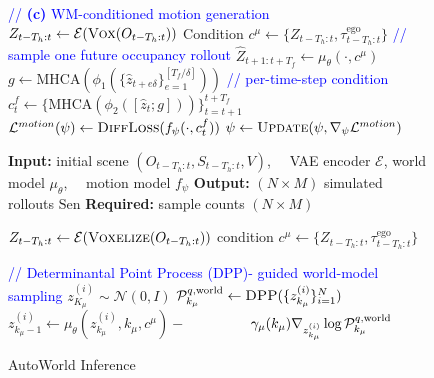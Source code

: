 \documentclass[runningheads]{llncs}
\begin{document}
\begin{figure}[!t]
\begin{minipage}[t]{0.51\textwidth}
\begin{algorithm}[H]
\begin{algorithmic}[1]
\Statex
\Statex \textcolor{blue}{// \textbf{(c)} WM-conditioned motion generation}
 \label{algline:motion_start}
    \State $Z_{t-T_h:t}\gets\mathcal E(\textsc{Vox}(O_{t-T_h:t}))$
    \State Condition $c^\mu\gets\{Z_{t-T_h:t},\tau^{\text{ego}}_{t-T_h:t}\}$
    \Statex \hspace{4mm} \textcolor{blue}{// sample one future occupancy rollout}
    \State $\hat Z_{t+1:t+T_f}\gets\mu_\theta(\cdot,c^\mu)$ \label{algline:sample_from_wm}
    \State $g\gets\mathrm{MHCA}(\phi_1\!(\{\hat z_{t+e\delta}\}_{e=1}^{[ T_f/\delta]}))$\label{algline:predictive_scene_context}
    \Statex \hspace{4mm} \textcolor{blue}{// per-time-step condition}
    \State $c_t^f\gets\{\mathrm{MHCA}(\phi_2([\hat z_t;g]))\}_{t=t+1}^{t+T_f}$ \label{algline:diff_condition}
    \State $\mathcal L^{motion}(\psi)\gets\textsc{DiffLoss}(f_\psi(\cdot,c_t^f))$
    \State $\psi\gets\textsc{Update}(\psi,\nabla_\psi\mathcal L^{motion})$
    \label{algline:motion_end}
\EndFor

\end{algorithmic}
\end{algorithm}
\end{minipage}
\begin{minipage}[t]{0.48\textwidth}
\begin{algorithm}[H]
\scriptsize
\caption{\small AutoWorld Inference}
\label{alg:infer}
\begin{algorithmic}[1]

\State \textbf{Input:} initial scene $(O_{t-T_h:t},S_{t-T_h:t},V)$,
\Statex $\quad$VAE encoder $\mathcal{E}$, world model $\mu_\theta$,
\Statex $\quad$motion model $f_\psi$
\State \textbf{Output:} $(N\times M)$ simulated rollouts $\text{Sen}$
\State \textbf{Required:} sample counts $(N\times M)$

\Statex
\State $Z_{t-T_h:t}\gets \mathcal E(\textsc{Voxelize}(O_{t-T_h:t}))$ \label{algline:vox_then_encode}
\State condition $c^\mu\gets\{Z_{t-T_h:t},\tau^{\text{ego}}_{t-T_h:t}\}$

\Statex
\Statex \textcolor{blue}{// Determinantal Point Process (DPP)-}
\Statex \textcolor{blue}{ guided world-model sampling}
 \label{algline:dpp_wm_start}
    \State $z^{(i)}_{K_\mu}\sim\mathcal N(0,I)$
\EndFor
{}
    \State $\mathcal P^{q,\text{world}}_{k_\mu}\gets \textsc{DPP}(\{z^{(i)}_{k_\mu}\}_{i=1}^{N})$
        \State \label{algline:dpp_wm_end} $z^{(i)}_{k_\mu-1}\gets \mu_\theta(z^{(i)}_{k_\mu},k_\mu,c^\mu)-$ 
        \Statex $\hspace{15mm}\gamma_\mu(k_\mu)\nabla_{z^{(i)}_{k_\mu}}\log \mathcal P^{q,\text{world}}_{k_\mu}$ 
    \EndFor
\EndFor


\end{algorithmic}
\end{algorithm}
\end{minipage}
\end{figure}
\end{document}
